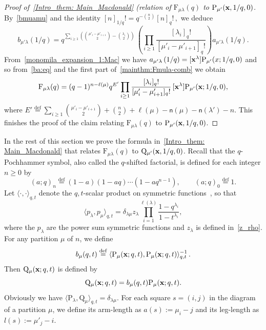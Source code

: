 \documentclass[12pt,a4paper,reqno]{amsart}
\theoremstyle{plain}
\theoremstyle{definition}
\newcommand{\defin}{\overset{\mathrm{def}}{=}}
\newcommand{\1}{\mathds{1}}
\renewcommand{\P}{\mathrm{P}}
\newcommand{\F}{\mathrm{F}}
\newcommand{\Q}{\mathrm{Q}}
\newcommand{\x}{{\bf x}}
\newcommand{\fn}{\mathsf{n}}
\begin{document}
\begin{proof}[Proof of~\cref{Intro_them: Main_Macdonald} (relation of $\F_{\mu\lambda}(q)$ to  $\P_{\mu'}(\x,1/q,0)$]
By~\cref{bmuamu} and the identity 
$
[n]_{1/q}!=q^{-\binom{n}{2}}[n]_q!\, ,
$
 we deduce
\begin{equation}\label{ba:eq}
b_{\mu'\lambda}\left(1/q\right)=q^{\sum_{i\geq 1}\left(\binom{\mu'_i-\mu'_{i+1}}{2}-\binom{\lambda_i}{2}\right)}\,\left(\prod_{i\geq 1}\frac{[\lambda_i]_q!}{[\mu'_i-\mu'_{i+1}]_q!}\right)a_{\mu'\lambda}\left(1/q\right). 
\end{equation}
From~\cref{monomila_expansion_1:Mac} we have $a_{\mu'\lambda}\left(1/q\right)=[\x^\lambda]\P_{\mu'}(x;1/q,0)$ and so from~\cref{ba:eq} and the first part of~\cref{mainthm:Fmula-comb}  we obtain
\begin{equation}
\label{eq:Fmula-q}
\F_{\mu\lambda}(q)=(q-1)^{n-\ell(\mu)}q^{E'}\prod_{i\geq 1}\frac{[\lambda_i]_q!}{[\mu_i'-\mu_{i+1}']_q!}\, [\x^\lambda]\P_{\mu'}(\x;1/q,0),
\end{equation}
where $E'\defin {\sum_{i\geq 1}\binom{\mu'_i-\mu'_{i+1}}{2}+\binom{n}{2}+\ell(\mu)-\fn(\mu)-\fn(\lambda')-n}$. 
This finishes the proof of the claim relating $\F_{\mu\lambda}(q)$ to  $\P_{\mu'}(\x,1/q,0)$.
\end{proof}
In the rest of this section we prove
the formula in~\cref{Intro_them: Main_Macdonald} that relates $\F_{\mu\lambda}(q)$ to  $\Q_{\mu'}(\x,1/q,0)$.
 Recall that the $q$-Pochhammer symbol, also called the $q$-shifted factorial, is defined for each integer $n\geq 0$ by 
$$
(a;q)_n\defin (1-a)(1-aq)\cdots(1-aq^{n-1}),\qquad (a;q)_0\defin 1.
$$
Let $\langle\cdot,\cdot\rangle_{q,t}$ denote the $q,t$-scalar product on symmetric functions~\cite[Sec. VI.1, p. 306]{Macdonald}, so that 
$$
\langle p_\lambda,p_\mu\rangle_{q,t}=\delta_{\lambda\mu}z_{\lambda}\prod_{i=1}^{\ell(\lambda)}\frac{1-q^{\lambda_i}}{1-t^{\lambda_i}},
$$
where the $p_\lambda$ are the power sum symmetric functions and $z_\lambda$ is defined in~\cref{z_rho}. 
For any partition $\mu$ of $n$, we define 
$$
b_{\mu}(q,t)\defin \langle\P_\mu(\x;q,t),\P_\mu(\x;q,t)\rangle_{q,t}^{-1}\,.
$$
Then  $\Q_{\mu}(\x;q,t)$ is  defined by
\begin{equation}\label{QPrelation}
\Q_\mu(\x;q,t)=b_\mu(q,t)\P_\mu(\x;q,t).
\end{equation}
Obviously we have $\langle\P_\lambda,\Q_\mu\rangle_{q,t}=\delta_{\lambda\mu}$. For each square $s = (i,j)$ in the diagram of a partition $\mu$, we define its arm-length as  $a(s) := \mu_i - j$
and its leg-length as  $l(s) := \mu'_j - i$.
\end{document}
